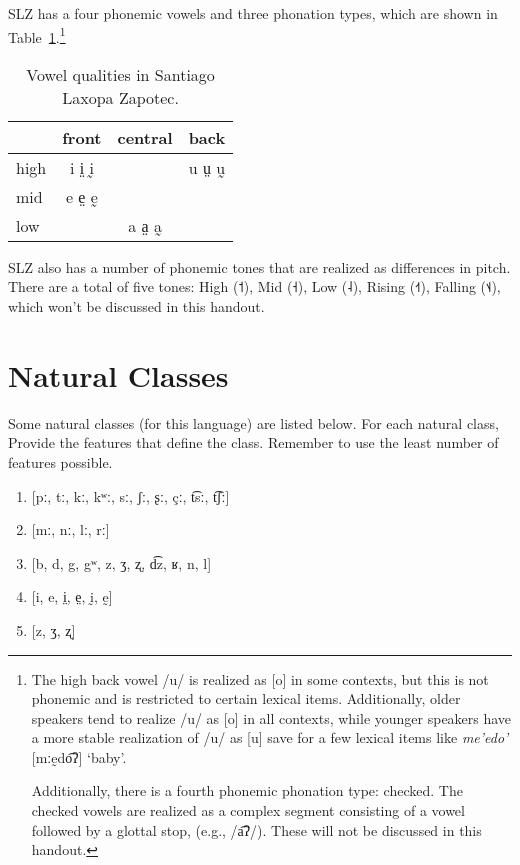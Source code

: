 \documentclass[12pt, letterpaper]{article}
\providecommand{\lsptoprule}{\midrule\toprule}
\providecommand{\lspbottomrule}{\bottomrule\midrule}
\begin{document}
SLZ has a four phonemic vowels and three phonation types, which are shown in Table~\ref{tab:SLZ_vowel_chart}.\footnote{The high back vowel /u/ is realized as [o] in some contexts, but this is not phonemic and is restricted to certain lexical items. Additionally, older speakers tend to realize /u/ as [o] in all contexts, while younger speakers have a more stable realization of /u/ as [u] save for a few lexical items like \textit{me'edo'} [mːḛdo͡ʔ] `baby'.

Additionally, there is a fourth phonemic phonation type: checked. The checked vowels are realized as a complex segment consisting of a vowel followed by a glottal stop, (e.g., /a͡ʔ/). These will not be discussed in this handout.} 

\begin{table}[h!]
    \centering
    \caption{Vowel qualities in Santiago Laxopa Zapotec. }
    \label{tab:SLZ_vowel_chart}
    \begin{tabular}{lccc}
        \lsptoprule
        &  front& central  & back \\
        \midrule 
        high   	&  i i̤ ḭ  &     &   u ṳ ṵ \\
        mid    	&  e e̤ ḛ &   	& 	\\
        low   	&     &  a a̤ a̰ 	&	  \\
        \lspbottomrule
    \end{tabular}
\end{table}

SLZ also has a number of phonemic tones that are realized as differences in pitch. There are a total of five tones: High (˦), Mid (˧), Low (˨), Rising (˧˦), Falling (˦˨), which won't be discussed in this handout. 

\section{Natural Classes} 

Some natural classes (for this language) are listed below. For each natural class, Provide the features that define the class. Remember to use the least number of features possible.

\begin{enumerate}
	\item {}[pː, tː, kː, kʷː, sː, ʃː, ʂː, çː, t͡sː, t͡ʃː]
	\item {}[mː, nː, lː, rː]
	\item {}[b, d, g, gʷ, z, ʒ, ʐ, d͡z, ʁ, n, l]
	\item {}[i, e, i̤, e̤, ḭ, ḛ]
	\item {}[z, ʒ, ʐ]
\end{enumerate}
\end{document}
